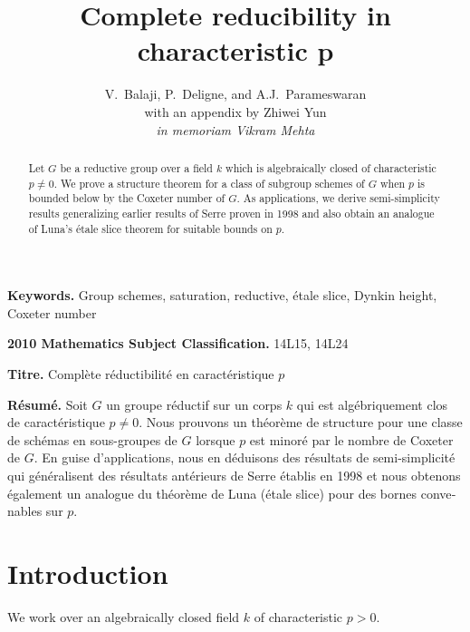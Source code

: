 \documentclass[11pt,a4paper]{article}
\title{Complete reducibility in characteristic p}
\author{V.~Balaji, P.~Deligne, and A.J.~Parameswaran\\with an appendix by Zhiwei Yun\\[1ex]\textit{in memoriam Vikram Mehta}}
\date{}
\theoremstyle{plain}
\theoremstyle{definition}
\begin{document}
\maketitle

\begin{abstract}
Let $G$ be a reductive group over a field $k$ which is algebraically closed of characteristic $p \neq 0$. We prove a structure theorem for a class of subgroup schemes of $G$ when $p$ is bounded below by the Coxeter number of $G$. As applications, we derive semi-simplicity results generalizing earlier results of Serre proven in 1998 and also obtain an analogue of Luna's \'etale slice theorem for suitable bounds on $p$.
\end{abstract}

\noindent\textbf{Keywords.} Group schemes, saturation, reductive, \'etale slice, Dynkin height, Coxeter number

\noindent\textbf{2010 Mathematics Subject Classification.} 14L15, 14L24

\begin{otherlanguage}{french}
\noindent\textbf{Titre.} Compl\`ete r\'eductibilit\'e en caract\'eristique $p$

\noindent\textbf{R\'esum\'e.} Soit $G$ un groupe r\'eductif sur un corps $k$ qui est alg\'ebriquement clos de caract\'eristique $p \neq 0$. Nous prouvons un th\'eor\`eme de structure pour une classe de sch\'emas en sous-groupes de $G$ lorsque $p$ est minor\'e par le nombre de Coxeter de $G$. En guise d'applications, nous en d\'eduisons des r\'esultats de semi-simplicit\'e qui g\'en\'eralisent des r\'esultats ant\'erieurs de Serre \'etablis en 1998 et nous obtenons \'egalement un analogue du th\'eor\`eme de Luna (\'etale slice) pour des bornes convenables sur $p$.
\end{otherlanguage}

\tableofcontents

\section{Introduction}

We work over an algebraically closed field $k$ of characteristic $p > 0$.
\end{document}
